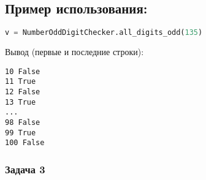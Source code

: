 \begin{enumerate}
\subsection*{Пример использования:}
\begin{lstlisting}[language=Python]
    v = NumberOddDigitChecker.all_digits_odd(135)
\end{lstlisting}
Вывод (первые и последние строки):
\begin{verbatim}
10 False
11 True
12 False
13 True
...
98 False
99 True
100 False
\end{verbatim}


\end{enumerate}

\subsubsection{Задача 3}

